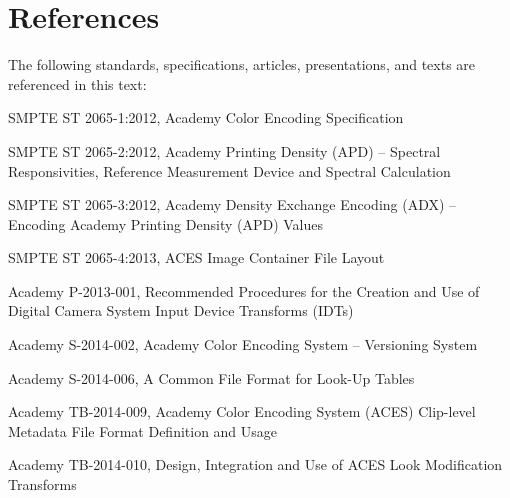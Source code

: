 \numberedformat
\chapter{References}
The following standards, specifications, articles, presentations, and texts are referenced in this text:

SMPTE ST 2065-1:2012, Academy Color Encoding Specification

SMPTE ST 2065-2:2012, Academy Printing Density (APD) -- Spectral Responsivities, Reference Measurement Device and Spectral Calculation

SMPTE ST 2065-3:2012, Academy Density Exchange Encoding (ADX) -- Encoding Academy Printing Density (APD) Values

SMPTE ST 2065-4:2013, ACES Image Container File Layout

Academy P-2013-001, Recommended Procedures for the Creation and Use of Digital Camera System Input Device Transforms (IDTs)

Academy S-2014-002, Academy Color Encoding System -- Versioning System

Academy S-2014-006, A Common File Format for Look-Up Tables

Academy TB-2014-009, Academy Color Encoding System (ACES) Clip-level Metadata File Format Definition and Usage

Academy TB-2014-010, Design, Integration and Use of ACES Look Modification Transforms